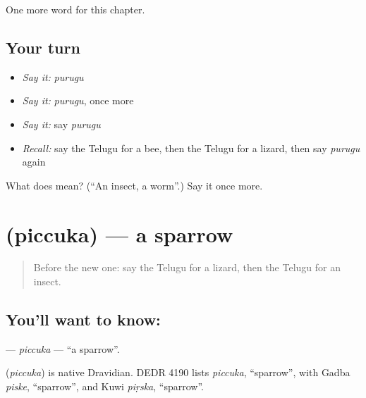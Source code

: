\begin{grammarlens}[title={What you've built}]
One more word for this chapter.
\end{grammarlens}

\subsection*{Your turn}
\begin{itemize}
\raggedright
  \item \emph{Say it:} \emph{purugu}
  \item \emph{Say it:} \emph{purugu}, once more
  \item \emph{Say it:} say \emph{purugu}
  \item \emph{Recall:} say the Telugu for a bee, then the Telugu for a lizard, then say \emph{purugu} again
\end{itemize}

\begin{tcolorbox}[breakable,colback=teal!4,colframe=teal!35!black,title={Before you move on}]
What does  mean? (\textquotedblleft{}An insect, a worm\textquotedblright{}.) Say it once more.
\end{tcolorbox}
\section[\texorpdfstring{\te{పిచ్చుక} (piccuka)}{పిచ్చుక (piccuka)}]{ (piccuka) — a sparrow}

\label{lesson:TE-C187-piccuka}



\begin{quote}
Before the new one: say the Telugu for a lizard, then the Telugu for an insect.
\end{quote}

\subsection*{You'll want to know: }
\textbf{} — \emph{piccuka} — \textquotedblleft{}a sparrow\textquotedblright{}.

\begin{cousinweb}
\textbf{} (\emph{piccuka}) is native Dravidian. DEDR 4190 lists \emph{piccuka}, \textquotedblleft{}sparrow\textquotedblright{}, with Gadba \emph{piske}, \textquotedblleft{}sparrow\textquotedblright{}, and Kuwi \emph{piṛska}, \textquotedblleft{}sparrow\textquotedblright{}.
\end{cousinweb}

